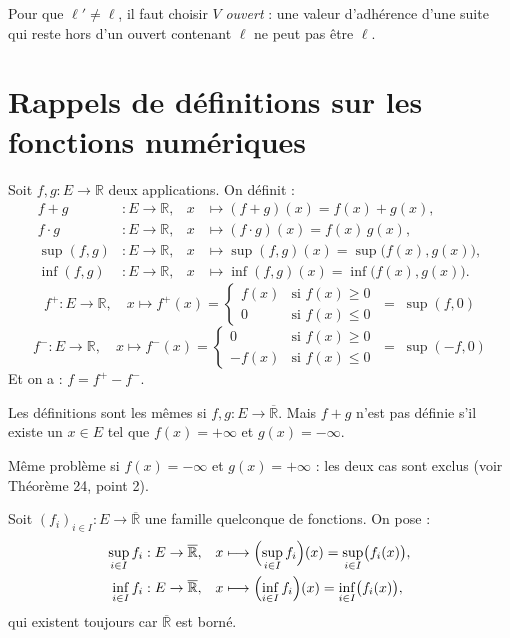 \documentclass[11pt,a4paper]{article}
\newcommand{\R}{\mathbb{R}}
\newcommand{\Rb}{\overline{\mathbb{R}}}
\begin{document}
\begin{note}
Pour que $\ell'\neq\ell$, il faut choisir $V$ \emph{ouvert} : une valeur d'adhérence d'une suite
qui reste hors d'un ouvert contenant $\ell$ ne peut pas être $\ell$.
\end{note}

\section*{Rappels de définitions sur les fonctions numériques}

Soit $f,g : E\to\R$ deux applications. On définit :
\begin{align*}
  f+g &: E\to\R, & x&\longmapsto (f+g)(x)=f(x)+g(x),\\
  f\cdot g &: E\to\R, & x&\longmapsto (f\cdot g)(x)=f(x)\,g(x),\\
  \sup(f,g) &: E\to\R, & x&\longmapsto \sup(f,g)(x)=\sup\bigl(f(x),g(x)\bigr),\\
  \inf(f,g) &: E\to\R, & x&\longmapsto \inf(f,g)(x)=\inf\bigl(f(x),g(x)\bigr).
\end{align*}
\[
  f^{+}:E\to\R,\quad x\longmapsto f^{+}(x)=
  \begin{cases} f(x) & \text{si } f(x)\ge 0\\ 0 & \text{si } f(x)\le 0\end{cases}
  \;=\;\sup(f,0)
\]
\[
  f^{-}:E\to\R,\quad x\longmapsto f^{-}(x)=
  \begin{cases} 0 & \text{si } f(x)\ge 0\\ -f(x) & \text{si } f(x)\le 0\end{cases}
  \;=\;\sup(-f,0)
\]
Et on a : $f=f^{+}-f^{-}$.

Les définitions sont les mêmes si $f,g : E\to\Rb$.
Mais $f+g$ n'est pas définie s'il existe un $x\in E$ tel que $f(x)=+\infty$ et $g(x)=-\infty$.

\begin{note}
Même problème si $f(x)=-\infty$ et $g(x)=+\infty$ : les deux cas sont exclus (voir Théorème 24, point 2).
\end{note}

Soit $(f_i)_{i\in I}: E\to\Rb$ une famille quelconque de fonctions. On pose :
\begin{align*}
  \sup_{i\in I} f_i &: E\to\Rb, & x&\longmapsto \Bigl(\sup_{i\in I} f_i\Bigr)(x)=\sup_{i\in I}\bigl(f_i(x)\bigr),\\
  \inf_{i\in I} f_i &: E\to\Rb, & x&\longmapsto \Bigl(\inf_{i\in I} f_i\Bigr)(x)=\inf_{i\in I}\bigl(f_i(x)\bigr),
\end{align*}
qui existent toujours car $\Rb$ est borné.
\end{document}

